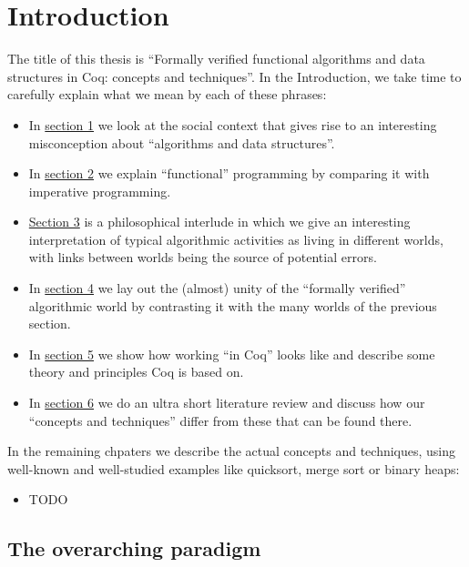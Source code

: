 \documentclass[declaration,mgr,english,shortabstract]{iithesis}
\author         {Wojciech Kołowski}
\date           {Czerwiec '20 chyba że koronawirus}                     %
\begin{document}

\chapter{Introduction} \label{ch1}

The title of this thesis is ``Formally verified functional algorithms and data structures in Coq: concepts and techniques''. In the Introduction, we take time to carefully explain what we mean by each of these phrases:

\begin{itemize}
    \item In \hyperref[ch1s1]{section 1} we look at the social context that gives rise to an interesting misconception about ``algorithms and data structures''.
    \item In \hyperref[ch1s2]{section 2} we explain ``functional'' programming by comparing it with imperative programming.
    \item \hyperref[ch1s3]{Section 3} is a philosophical interlude in which we give an interesting interpretation of typical algorithmic activities as living in different worlds, with links between worlds being the source of potential errors.
    \item In \hyperref[ch1s4]{section 4} we lay out the (almost) unity of the ``formally verified'' algorithmic world by contrasting it with the many worlds of the previous section.
    \item In \hyperref[ch1s5]{section 5} we show how working ``in Coq'' looks like and describe some theory and principles Coq is based on.
    \item In \hyperref[ch1s6]{section 6} we do an ultra short literature review and discuss how our ``concepts and techniques'' differ from these that can be found there.
\end{itemize}

In the remaining chpaters we describe the actual concepts and techniques, using well-known and well-studied examples like quicksort, merge sort or binary heaps:

\begin{itemize}
    \item TODO
\end{itemize}

\section{The overarching paradigm} \label{ch1s1}
\end{document}
